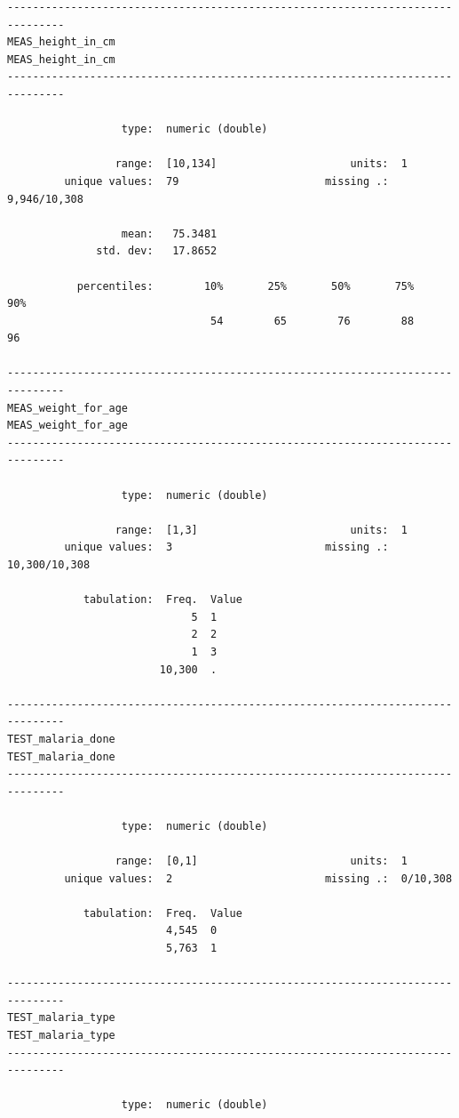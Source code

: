\documentclass[
  letterpaper,
  DIV=11,
  numbers=noendperiod]{scrreprt}
\begin{document}
\begin{verbatim}
-------------------------------------------------------------------------------
MEAS_height_in_cm                                             MEAS_height_in_cm
-------------------------------------------------------------------------------

                  type:  numeric (double)

                 range:  [10,134]                     units:  1
         unique values:  79                       missing .:  9,946/10,308

                  mean:   75.3481
              std. dev:   17.8652

           percentiles:        10%       25%       50%       75%       90%
                                54        65        76        88        96

-------------------------------------------------------------------------------
MEAS_weight_for_age                                         MEAS_weight_for_age
-------------------------------------------------------------------------------

                  type:  numeric (double)

                 range:  [1,3]                        units:  1
         unique values:  3                        missing .:  10,300/10,308

            tabulation:  Freq.  Value
                             5  1
                             2  2
                             1  3
                        10,300  .

-------------------------------------------------------------------------------
TEST_malaria_done                                             TEST_malaria_done
-------------------------------------------------------------------------------

                  type:  numeric (double)

                 range:  [0,1]                        units:  1
         unique values:  2                        missing .:  0/10,308

            tabulation:  Freq.  Value
                         4,545  0
                         5,763  1

-------------------------------------------------------------------------------
TEST_malaria_type                                             TEST_malaria_type
-------------------------------------------------------------------------------

                  type:  numeric (double)


\end{verbatim}
\end{document}

